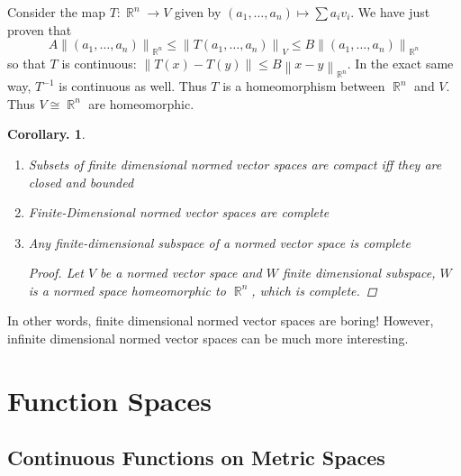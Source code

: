\documentclass[11pt, a4paper]{memoir}
\DeclareMathOperator{\R}{{\mathbb{R}}}
\newcommand{\norm}[1]{\ensuremath{\left\lVert#1\right\rVert}}
\theoremstyle{change}
\newtheorem{corollary}[theorem]{Corollary.}
\theoremstyle{plain}
\theoremstyle{nonumberplain}
\newtheorem{proof}{Proof}
\numberwithin{equation}{section}
\begin{document}
Consider the map $T:\R^n\to V$ given by $(a_1,\ldots,a_n)\mapsto\sum a_iv_i$. We have just proven that
\[A\norm{(a_1,\ldots,a_n)}_{\R^n}\leq\norm{T(a_1,\ldots,a_n)}_V\leq B\norm{(a_1,\ldots,a_n)}_{\R^n}\]
so that $T$ is continuous: $\norm{T(x)-T(y)}\leq B\norm{x-y}_{\R^n}$. In the exact same way, $T^{-1}$ is continuous as
well. Thus $T$ is a homeomorphism between $\R^n$ and $V$. Thus $V\cong\R^n$ are homeomorphic.
\begin{corollary}
    \begin{enumerate}
        \item Subsets of finite dimensional normed vector spaces are compact iff they are closed and bounded
        \item Finite-Dimensional normed vector spaces are complete
        \item Any finite-dimensional subspace of a normed vector space is complete
            \begin{proof}
                Let $V$ be a normed vector space and $W$ finite dimensional subspace, $W$ is a normed space homeomorphic
                to $\R^n$, which is complete.
            \end{proof}
    \end{enumerate}
\end{corollary}
In other words, finite dimensional normed vector spaces are boring! However, infinite dimensional normed vector spaces
can be much more interesting.
\chapter{Function Spaces}
\section{Continuous Functions on Metric Spaces}
\end{document}
